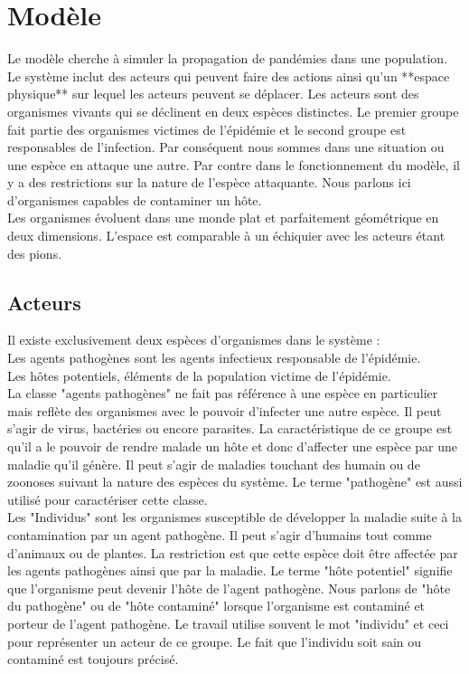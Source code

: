 \chapter{Modèle} \label{ch:intro}

Le modèle cherche à simuler la propagation de pandémies dans une population. Le système inclut des acteurs qui peuvent faire des actions ainsi qu'un **espace physique** sur lequel les acteurs peuvent se déplacer. Les acteurs sont des organismes vivants qui se déclinent en deux espèces distinctes. Le premier groupe fait partie des organismes victimes de l'épidémie et le second groupe est responsables de l'infection. Par conséquent nous sommes dans une situation ou une espèce en attaque une autre. Par contre dans le fonctionnement du modèle, il y a des restrictions sur la nature de l'espèce attaquante. Nous parlons ici d'organismes capables de contaminer un hôte. \\

Les organismes évoluent dans une monde plat et parfaitement géométrique en deux dimensions. L'espace est comparable à un échiquier avec les acteurs étant des pions.

\section{Acteurs}

Il existe exclusivement deux espèces d'organismes dans le système :\\

Les agents pathogènes sont les agents infectieux responsable de l'épidémie.\\
Les hôtes potentiels, éléments de la population victime de l'épidémie.\\

La classe "agents pathogènes" ne fait pas référence à une espèce en particulier mais reflète des organismes avec le pouvoir d'infecter une autre espèce. Il peut s'agir de virus, bactéries ou encore parasites. La caractéristique de ce groupe est qu'il a le pouvoir de rendre malade un hôte et donc d'affecter une espèce par une maladie qu'il génère. Il peut s'agir de maladies touchant des humain ou de zoonoses suivant la nature des espèces du système. Le terme "pathogène" est aussi utilisé pour caractériser cette classe.\\

Les "Individus" sont les organismes susceptible de développer la maladie suite à la contamination par un agent pathogène. Il peut s'agir d'humains tout comme d'animaux ou de plantes. La restriction est que cette espèce doit être affectée par les agents pathogènes ainsi que par la maladie. Le terme "hôte potentiel" signifie que l'organisme peut devenir l'hôte de l'agent pathogène. Nous parlons de "hôte du pathogène" ou de "hôte contaminé" lorsque l'organisme est contaminé et porteur de l'agent pathogène. Le travail utilise souvent le mot "individu" et ceci pour représenter un acteur de ce groupe. Le fait que l'individu soit sain ou contaminé est toujours précisé.

